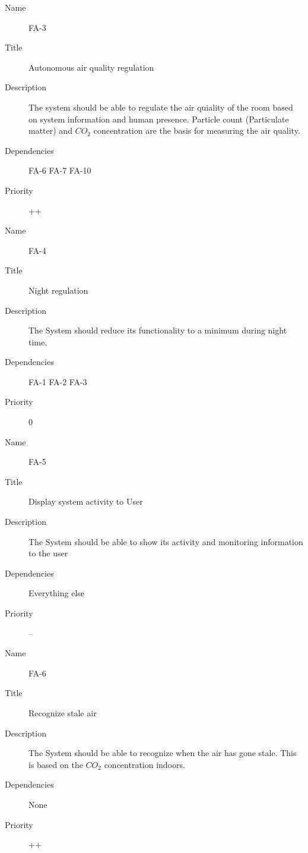 \documentclass[runningheads]{llncs}
\begin{document}
    \begin{description}
        \item[Name] FA-3
        \item[Title] Autonomous air quality regulation
        \item[Description] The system should be able to regulate the air quiality of the room based on system information and human presence. Particle count (Particulate matter) and $CO_2$ concentration are the basis for measuring the air quality.
        \item[Dependencies] FA-6 FA-7 FA-10
        \item[Priority] ++
    \end{description}

    \begin{description}
        \item[Name] FA-4
        \item[Title] Night regulation
        \item[Description] The System should reduce its functionality to a minimum during night time.
        \item[Dependencies] FA-1 FA-2 FA-3
        \item[Priority] 0
    \end{description}

    \begin{description}
        \item[Name] FA-5
        \item[Title] Display system activity to User
        \item[Description] The System should be able to show its activity and monitoring information to the user
        \item[Dependencies] Everything else
        \item[Priority] --
    \end{description}

    \begin{description}
        \item[Name] FA-6
        \item[Title] Recognize stale air
        \item[Description] The System should be able to recognize when the air has gone stale. This is based on the $CO_2$ concentration indoors.
        \item[Dependencies] None
        \item[Priority] ++
    \end{description}
\end{document}
